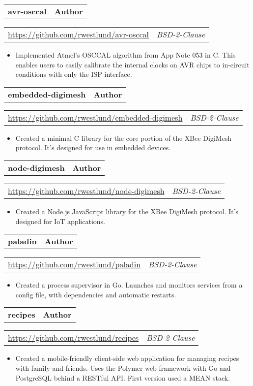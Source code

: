 \documentclass[10pt,letterpaper]{article}
\newcommand{\headerrow}[2]{%
    \begin{tabularx}{\linewidth}{Xr}
	    #1 & #2 \\
    \end{tabularx}
}
\begin{document}
    \headerrow{\textbf{avr-osccal}}{\textbf{Author}}
    \headerrow{\url{https://github.com/rwestlund/avr-osccal}}{\textit{BSD-2-Clause}}
    \begin{itemize}[label=--]
        \item Implemented Atmel's OSCCAL algorithm from App Note 053 in C.
            This enables users to easily calibrate the internal clocks on
            AVR chips to in-circuit conditions with only the ISP interface.
    \end{itemize}

    \headerrow{\textbf{embedded-digimesh}}{\textbf{Author}}
    \headerrow{\url{https://github.com/rwestlund/embedded-digimesh}}{\textit{BSD-2-Clause}}
    \begin{itemize}[label=--]
        \item Created a minimal C library for the core portion of the XBee
            DigiMesh protocol.  It's designed for use in embedded devices.
    \end{itemize}

    \headerrow{\textbf{node-digimesh}}{\textbf{Author}}
    \headerrow{\url{https://github.com/rwestlund/node-digimesh}}{\textit{BSD-2-Clause}}
    \begin{itemize}[label=--]
        \item Created a Node.js JavaScript library for the XBee DigiMesh
            protocol.  It's designed for IoT applications.
    \end{itemize}

    \headerrow{\textbf{paladin}}{\textbf{Author}}
    \headerrow{\url{https://github.com/rwestlund/paladin}}{\textit{BSD-2-Clause}}
    \begin{itemize}[label=--]
        \item Created a process supervisor in Go.  Launches and monitors
            services from a config file, with dependencies and automatic
            restarts.
    \end{itemize}

    \headerrow{\textbf{recipes}}{\textbf{Author}}
    \headerrow{\url{https://github.com/rwestlund/recipes}}{\textit{BSD-2-Clause}}
    \begin{itemize}[label=--]
        \item Created a mobile-friendly client-side web application for
            managing recipes with family and friends.  Uses the Polymer web
            framework with Go and PostgreSQL behind a RESTful API\@.  First
            version used a MEAN stack.
    \end{itemize}
\end{document}

